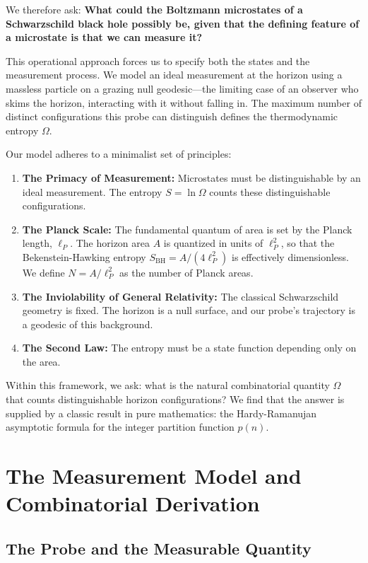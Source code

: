 \documentclass[12pt, letterpaper]{article}
\begin{document}
We therefore ask: \textbf{What could the Boltzmann microstates of a Schwarzschild black hole possibly be, given that the defining feature of a microstate is that we can measure it?}

This operational approach forces us to specify both the states and the measurement process. We model an ideal measurement at the horizon using a massless particle on a grazing null geodesic—the limiting case of an observer who skims the horizon, interacting with it without falling in. The maximum number of distinct configurations this probe can distinguish defines the thermodynamic entropy $\Omega$.

Our model adheres to a minimalist set of principles:

\begin{enumerate}
\item \textbf{The Primacy of Measurement:} Microstates must be distinguishable by an ideal measurement. The entropy $S = \ln \Omega$ counts these distinguishable configurations.
\item \textbf{The Planck Scale:} The fundamental quantum of area is set by the Planck length, $\ell_P$. The horizon area $A$ is quantized in units of $\ell_P^2$, so that the Bekenstein-Hawking entropy $S_{\text{BH}} = A/(4\ell_P^2)$ is effectively dimensionless. We define $N = A/\ell_P^2$ as the number of Planck areas.
\item \textbf{The Inviolability of General Relativity:} The classical Schwarzschild geometry is fixed. The horizon is a null surface, and our probe's trajectory is a geodesic of this background.
\item \textbf{The Second Law:} The entropy must be a state function depending only on the area.
\end{enumerate}

Within this framework, we ask: what is the natural combinatorial quantity $\Omega$ that counts distinguishable horizon configurations? We find that the answer is supplied by a classic result in pure mathematics: the Hardy-Ramanujan asymptotic formula for the integer partition function $p(n)$.

\section{The Measurement Model and Combinatorial Derivation}

\subsection{The Probe and the Measurable Quantity}
\end{document}
